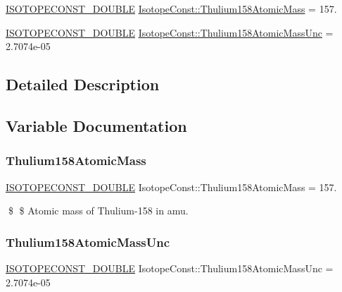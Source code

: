 \begin{DoxyCompactItemize}
\item 
\mbox{\hyperlink{group___isotope_const-_macros_ga8f45a7272ce02c0b4c65c44636ed719a}{I\+S\+O\+T\+O\+P\+E\+C\+O\+N\+S\+T\+\_\+\+D\+O\+U\+B\+LE}} \mbox{\hyperlink{group___isotope_const-_thulium-_tm158_gae3699ddec90148d7e6202081ecfae5ae}{Isotope\+Const\+::\+Thulium158\+Atomic\+Mass}} = 157.
\item 
\mbox{\hyperlink{group___isotope_const-_macros_ga8f45a7272ce02c0b4c65c44636ed719a}{I\+S\+O\+T\+O\+P\+E\+C\+O\+N\+S\+T\+\_\+\+D\+O\+U\+B\+LE}} \mbox{\hyperlink{group___isotope_const-_thulium-_tm158_ga310f4945ee78cb1c9882d0564be5c68b}{Isotope\+Const\+::\+Thulium158\+Atomic\+Mass\+Unc}} = 2.\+7074e-\/05
\end{DoxyCompactItemize}


\subsection{Detailed Description}


\subsection{Variable Documentation}
\mbox{\label{group___isotope_const-_thulium-_tm158_gae3699ddec90148d7e6202081ecfae5ae}} 
\subsubsection{\texorpdfstring{Thulium158\+Atomic\+Mass}{Thulium158AtomicMass}}
{\footnotesize\ttfamily \mbox{\hyperlink{group___isotope_const-_macros_ga8f45a7272ce02c0b4c65c44636ed719a}{I\+S\+O\+T\+O\+P\+E\+C\+O\+N\+S\+T\+\_\+\+D\+O\+U\+B\+LE}} Isotope\+Const\+::\+Thulium158\+Atomic\+Mass = 157.}

\$ \$ Atomic mass of Thulium-\/158 in amu. \mbox{\label{group___isotope_const-_thulium-_tm158_ga310f4945ee78cb1c9882d0564be5c68b}} 
\subsubsection{\texorpdfstring{Thulium158\+Atomic\+Mass\+Unc}{Thulium158AtomicMassUnc}}
{\footnotesize\ttfamily \mbox{\hyperlink{group___isotope_const-_macros_ga8f45a7272ce02c0b4c65c44636ed719a}{I\+S\+O\+T\+O\+P\+E\+C\+O\+N\+S\+T\+\_\+\+D\+O\+U\+B\+LE}} Isotope\+Const\+::\+Thulium158\+Atomic\+Mass\+Unc = 2.\+7074e-\/05}

